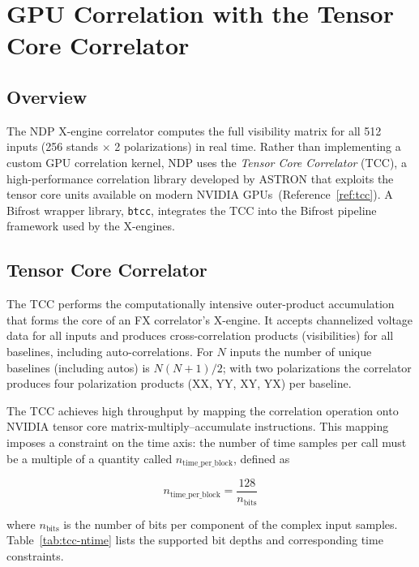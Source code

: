 
\chapter{GPU Correlation with the Tensor Core Correlator}
\label{app:correlator}

\section{Overview}

The NDP X-engine correlator computes the full visibility matrix for all 512 inputs (256 stands $\times$ 2 polarizations) in real time.  Rather than implementing a custom GPU correlation kernel, NDP uses the \emph{Tensor Core Correlator} (TCC), a high-performance correlation library developed by ASTRON that exploits the tensor core units available on modern NVIDIA GPUs~(Reference~\ref{ref:tcc}).  A Bifrost wrapper library, \texttt{btcc}, integrates the TCC into the Bifrost pipeline framework used by the X-engines.

\section{Tensor Core Correlator}

The TCC performs the computationally intensive outer-product accumulation that forms the core of an FX correlator's X-engine.  It accepts channelized voltage data for all inputs and produces cross-correlation products (visibilities) for all baselines, including auto-correlations.  For $N$ inputs the number of unique baselines (including autos) is $N(N+1)/2$; with two polarizations the correlator produces four polarization products (XX, YY, XY, YX) per baseline.

The TCC achieves high throughput by mapping the correlation operation onto NVIDIA tensor core matrix-multiply--accumulate instructions.  This mapping imposes a constraint on the time axis: the number of time samples per call must be a multiple of a quantity called $n_\mathrm{time\_per\_block}$, defined as

\begin{equation}
    n_\mathrm{time\_per\_block} = \frac{128}{n_\mathrm{bits}}
    \label{eq:ntime-per-block}
\end{equation}

\noindent where $n_\mathrm{bits}$ is the number of bits per component of the complex input samples.  Table~\ref{tab:tcc-ntime} lists the supported bit depths and corresponding time constraints.

